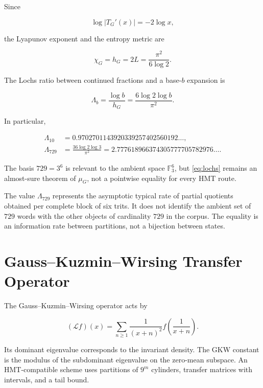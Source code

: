 Since

\[
\log|T_G'(x)|=-2\log x,
\]

the Lyapunov exponent and the entropy metric are

\begin{equation}
\chi_G=h_G=2L=\frac{\pi^2}{6\log2}.
\label{eq:gauss-entropy}
\end{equation}

The Lochs ratio between continued fractions and a base-\(b\) expansion is

\begin{equation}
\Lambda_b=\frac{\log b}{h_G}
=\frac{6\log2\log b}{\pi^2}.
\label{eq:lochs}
\end{equation}

In particular,

\begin{align*}
\Lambda_{10}&=0.9702701143920339257402560192\ldots,\\
\Lambda_{729}&=\frac{36\log2\log3}{\pi^2}
=2.777618966374305777705782976\ldots.
\end{align*}

The basis \(729=3^6\) is relevant to the ambient space \(\mathbb F_3^6\), but \cref{eq:lochs} remains an almost-sure theorem of \(\mu_G\), not a pointwise equality for every HMT route.

The value \(\Lambda_{729}\) represents the asymptotic typical rate of
partial quotients obtained per complete block of six trits. It does not identify the
ambient set of \(729\) words with the other objects of cardinality \(729\) in the
corpus. The equality is an information rate between partitions, not a
bijection between states.

\section{Gauss--Kuzmin--Wirsing Transfer Operator}

The Gauss--Kuzmin--Wirsing operator acts by

\begin{equation}
(\mathcal L f)(x)=\sum_{n\ge1}\frac1{(x+n)^2}
f\!\left(\frac1{x+n}\right).
\label{eq:gkw-operator}
\end{equation}

Its dominant eigenvalue corresponds to the invariant density. The GKW constant is the modulus of the subdominant eigenvalue on the zero-mean subspace. An HMT-compatible scheme uses partitions of \(9^m\) cylinders, transfer matrices with intervals, and a tail bound.

